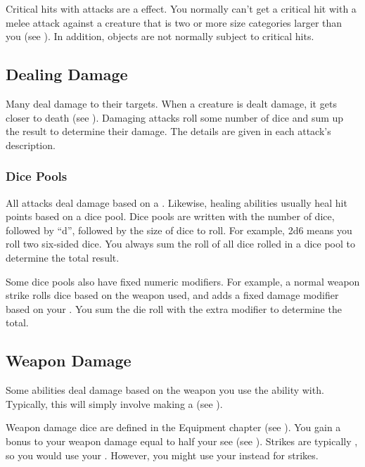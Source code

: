             Critical hits with  attacks are a  effect.
            You normally can't get a critical hit with a melee attack against a creature that is two or more size categories larger than you (see ).
            In addition, objects are not normally subject to critical hits.

    \subsection{Dealing Damage}\label{Dealing Damage}
        Many  deal damage to their targets.
        When a creature is dealt damage, it gets closer to death (see ).
        Damaging attacks roll some number of dice and sum up the result to determine their damage.
        The details are given in each attack's description.

        \subsubsection{Dice Pools}\label{Dice Pools}
            All attacks deal damage based on a .
            Likewise, healing abilities usually heal hit points based on a dice pool.
            Dice pools are written with the number of dice, followed by ``d'', followed by the size of dice to roll.
            For example, 2d6 means you roll two six-sided dice.
            You always sum the roll of all dice rolled in a dice pool to determine the total result.

            Some dice pools also have fixed numeric modifiers.
            For example, a normal weapon strike rolls dice based on the weapon used, and adds a fixed damage modifier based on your .
            You sum the die roll with the extra modifier to determine the total.

    \subsection{Weapon Damage}\label{Weapon Damage}
        Some abilities deal damage based on the weapon you use the ability with.
        Typically, this will simply involve making a  (see ).

        Weapon damage dice are defined in the Equipment chapter (see ).
        You gain a bonus to your weapon damage equal to half your  see (see ).
        Strikes are typically , so you would use your .
        However, you might use your  instead for \magical strikes.

